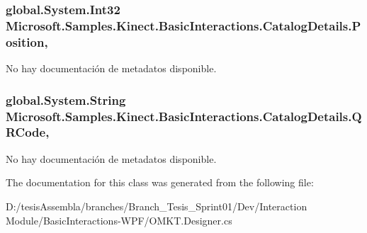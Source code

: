 \hypertarget{class_microsoft_1_1_samples_1_1_kinect_1_1_basic_interactions_1_1_catalog_details_a97d1b82a27adf8e617528e43d2b24eae}{
\subsubsection[{Position}]{\setlength{\rightskip}{0pt plus 5cm}global.\-System.\-Int32 Microsoft.\-Samples.\-Kinect.\-Basic\-Interactions.\-Catalog\-Details.\-Position\hspace{0.3cm}{\ttfamily [get]}, {\ttfamily [set]}}}\label{class_microsoft_1_1_samples_1_1_kinect_1_1_basic_interactions_1_1_catalog_details_a97d1b82a27adf8e617528e43d2b24eae}


No hay documentación de metadatos disponible. 

\hypertarget{class_microsoft_1_1_samples_1_1_kinect_1_1_basic_interactions_1_1_catalog_details_a139fa6ef9fbfaadce43840127a5127b1}{
\subsubsection[{Q\-R\-Code}]{\setlength{\rightskip}{0pt plus 5cm}global.\-System.\-String Microsoft.\-Samples.\-Kinect.\-Basic\-Interactions.\-Catalog\-Details.\-Q\-R\-Code\hspace{0.3cm}{\ttfamily [get]}, {\ttfamily [set]}}}\label{class_microsoft_1_1_samples_1_1_kinect_1_1_basic_interactions_1_1_catalog_details_a139fa6ef9fbfaadce43840127a5127b1}


No hay documentación de metadatos disponible. 



The documentation for this class was generated from the following file\-:\begin{DoxyCompactItemize}
\item 
D\-:/tesis\-Assembla/branches/\-Branch\-\_\-\-Tesis\-\_\-\-Sprint01/\-Dev/\-Interaction Module/\-Basic\-Interactions-\/\-W\-P\-F/O\-M\-K\-T.\-Designer.\-cs\end{DoxyCompactItemize}
